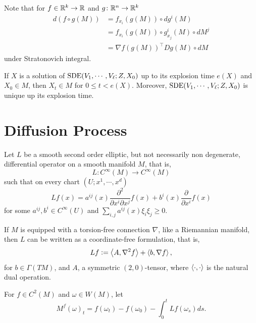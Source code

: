 \begin{rmk}
    Note that for $f \in \mathbb{R}^k \rightarrow \mathbb{R}$ and $g \colon \mathbb{R}^n \rightarrow \mathbb{R}^k$
    \begin{align*}
        d (f \circ g(M)) &= f_{x_i}(g(M)) \circ dg^i(M) \\
        &= f_{x_i}(g(M)) \circ g^i_{x_j}(M) \circ dM^j \\
        &= \nabla f(g(M))^\top Dg(M) \circ dM
    \end{align*}
    under Stratonovich integral.
\end{rmk}
\begin{rmk}
    If $X$ is a solution of $\operatorname{SDE}(V_1,\cdots,V_\ell;Z,X_0)$ up to its explosion time $e(X)$ and $X_0 \in M$, then $X_t \in M$ for $0 \leq t < e(X)$. Moreover, $\operatorname{SDE}(V_1,\cdots,V_\ell;Z,X_0)$ is unique up its explosion time.
\end{rmk}

\section{Diffusion Process}

Let $L$ be a smooth second order elliptic, but not necessarily non degenerate, differential operator on a smooth manifold $M$, that is, 
\begin{equation*}
    L \colon C^\infty(M) \rightarrow C^\infty(M)
\end{equation*}
such that on every chart $(U;x^1,\cdots,x^d)$
\begin{equation*}
    Lf(x) = a^{ij}(x) \frac{\partial^2}{\partial x^i \partial x^j} f(x) + b^i(x)\frac{\partial}{\partial x^i}f(x)
\end{equation*}
for some $a^{ij},b^i \in C^\infty(U)$ and $\sum_{i,j}a^{ij}(x)\xi_i\xi_j \geq 0$.
\begin{rmk}
    If $M$ is equipped with a torsion-free connection $\nabla$, like a Riemannian manifold, then $L$ can be written as a coordinate-free formulation, that is,
    \begin{equation*}
        Lf \vcentcolon= \left\langle A,\nabla^2 f \right\rangle + \left\langle b,\nabla f \right\rangle,
    \end{equation*}
    for $b \in \Gamma(TM)$, and $A$, a symmetric $(2,0)$-tensor, where $\left\langle \cdot,\cdot \right\rangle$ is the natural dual operation.
\end{rmk}
For $f \in C^2(M)$ and $\omega \in W(M)$, let
\begin{equation*}
    M^f(\omega)_t = f(\omega_t) - f(\omega_0) - \int_0^t Lf(\omega_s)ds.
\end{equation*}

